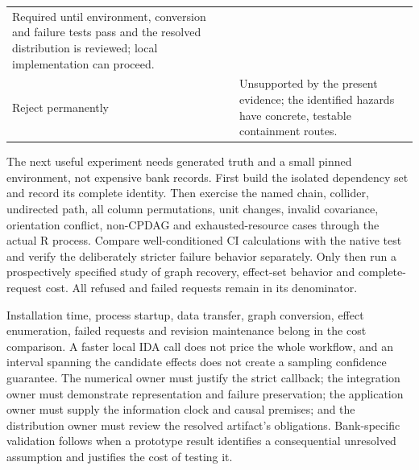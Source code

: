 \begin{longtable}[]{@{}ll@{}}
\begin{minipage}[t]{0.47\columnwidth}
Required until environment, conversion and failure tests pass and the
resolved distribution is reviewed; local implementation can
proceed.\strut
\end{minipage}\tabularnewline
\begin{minipage}[t]{0.47\columnwidth}\raggedright
Reject permanently\strut
\end{minipage} & \begin{minipage}[t]{0.47\columnwidth}\raggedright
Unsupported by the present evidence; the identified hazards have
concrete, testable containment routes.\strut
\end{minipage}\tabularnewline
\bottomrule
\end{longtable}

The next useful experiment needs generated truth and a small pinned
environment, not expensive bank records. First build the isolated
dependency set and record its complete identity. Then exercise the named
chain, collider, undirected path, all column permutations, unit changes,
invalid covariance, orientation conflict, non-CPDAG and
exhausted-resource cases through the actual R process. Compare
well-conditioned CI calculations with the native test and verify the
deliberately stricter failure behavior separately. Only then run a
prospectively specified study of graph recovery, effect-set behavior and
complete-request cost. All refused and failed requests remain in its
denominator.

Installation time, process startup, data transfer, graph conversion,
effect enumeration, failed requests and revision maintenance belong in
the cost comparison. A faster local IDA call does not price the whole
workflow, and an interval spanning the candidate effects does not create
a sampling confidence guarantee. The numerical owner must justify the
strict callback; the integration owner must demonstrate representation
and failure preservation; the application owner must supply the
information clock and causal premises; and the distribution owner must
review the resolved artifact's obligations. Bank-specific validation
follows when a prototype result identifies a consequential unresolved
assumption and justifies the cost of testing it.

\label{exec13:pcalg-reuse-end}
